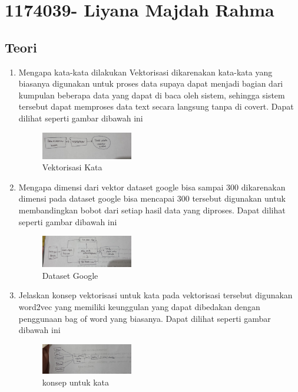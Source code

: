\section{1174039- Liyana Majdah Rahma}
    \subsection{Teori}
    \begin{enumerate}
        \item Mengapa kata-kata dilakukan Vektorisasi
        \subitem dikarenakan kata-kata yang biasanya digunakan untuk proses data supaya dapat menjadi bagian dari kumpulan beberapa data yang dapat di baca oleh sistem, sehingga sistem tersebut dapat memproses data text secara langsung tanpa di covert. Dapat dilihat seperti gambar dibawah ini
        \begin{figure}[H]
            \includegraphics[width=4cm]{figures/1174039/chapter5/teori1.jpeg}
            \centering
            \caption{Vektorisasi Kata}
        \end{figure}
        
        \item Mengapa dimensi dari vektor dataset google bisa sampai 300
        \subitem dikarenakan dimensi pada dataset google bisa mencapai 300 tersebut digunakan untuk membandingkan bobot dari setiap hasil data yang diproses. Dapat dilihat seperti gambar dibawah ini
        \begin{figure}[H]
            \includegraphics[width=4cm]{figures/1174039/chapter5/teori2.jpeg}
            \centering
            \caption{Dataset Google}
        \end{figure}
        
        \item Jelaskan konsep vektorisasi untuk kata
        \subitem pada vektorisasi tersebut digunakan word2vec yang memiliki keunggulan yang dapat dibedakan dengan penggunaan bag of word yang biasanya. Dapat dilihat seperti gambar dibawah ini
        \begin{figure}[H]
            \includegraphics[width=4cm]{figures/1174039/chapter5/teori3.jpeg}
            \centering
            \caption{konsep untuk kata}
        \end{figure}
        

\end{enumerate}
